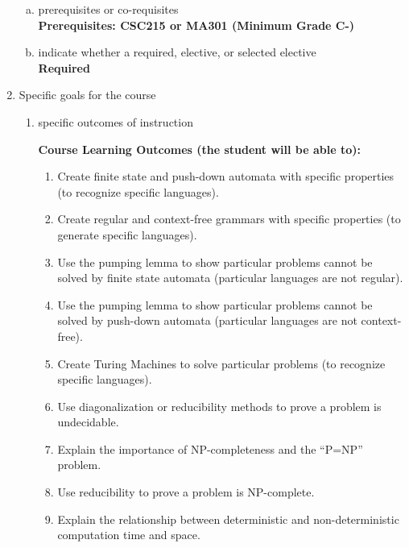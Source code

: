 \begin{enumerate}[1.]
\begin{enumerate}[a.]
\item prerequisites or co-requisites\\
  {\bfseries
    Prerequisites: CSC215 or MA301 (Minimum Grade C-)
  }

\item indicate whether a required, elective, or selected elective\\ %
  {\bfseries
    Required
  }

\end{enumerate}

\item Specific goals for the course
\begin{enumerate}
\item specific outcomes of instruction\\ %
  {\bfseries
    Course Learning Outcomes (the student will be able to):
\begin{enumerate}[1.]
\item Create finite state and push-down automata with specific properties (to recognize specific languages).
\item Create regular and context-free grammars with specific properties (to generate specific languages).
\item Use the pumping lemma to show particular problems cannot be solved by finite state automata (particular languages are not regular).
\item Use the pumping lemma to show particular problems cannot be solved by push-down automata (particular languages are not context-free).
\item Create Turing Machines to solve particular problems (to recognize specific languages).
\item Use diagonalization or reducibility methods to prove a problem is undecidable.
\item Explain the importance of NP-completeness and the ``P=NP'' problem.
\item Use reducibility to prove a problem is NP-complete.
\item Explain the relationship between deterministic and non-deterministic computation time and space.
\end{enumerate}
  }


\end{enumerate}
\end{enumerate}
